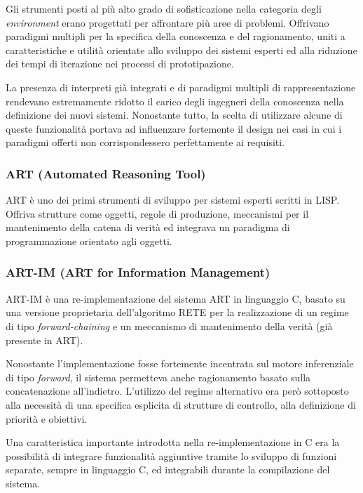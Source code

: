 Gli strumenti posti al più alto grado di sofisticazione nella categoria degli \emph{environment} erano progettati per affrontare più aree di problemi. Offrivano paradigmi multipli per la specifica della conoscenza e del ragionamento, uniti a caratteristiche e utilità orientate allo sviluppo dei sistemi esperti ed alla riduzione dei tempi di iterazione nei processi di prototipazione. 

La presenza di interpreti già integrati e di paradigmi multipli di rappresentazione rendevano estremamente ridotto il carico degli ingegneri della conoscenza nella definizione dei nuovi sistemi. Nonostante tutto, la scelta di utilizzare alcune di queste funzionalità portava ad influenzare fortemente il design nei casi in cui i paradigmi offerti non corrispondessero perfettamente ai requisiti.~\cite{development1993}

\subsubsection[ART]{ART (Automated Reasoning Tool)}
ART è uno dei primi strumenti di sviluppo per sistemi esperti scritti in LISP. Offriva strutture come oggetti, regole di produzione, meccanismi per il mantenimento della catena di verità ed integrava un paradigma di programmazione orientato agli oggetti.~\cite{art1998}

\subsubsection[ART-IM]{ART-IM (ART for Information Management)}
ART-IM è una re-implementazione del sistema ART in linguaggio C, basato su una versione proprietaria dell'algoritmo RETE per la realizzazione di un regime di tipo \emph{forward-chaining} e un meccanismo di mantenimento della verità (già presente in ART).

Nonostante l'implementazione fosse fortemente incentrata sul motore inferenziale di tipo \emph{forward}, il sistema permetteva anche ragionamento basato sulla concatenazione all'indietro. L'utilizzo del regime alternativo era però sottoposto alla necessità di una specifica esplicita di strutture di controllo, alla definizione di priorità e obiettivi.

Una caratteristica importante introdotta nella re-implementazione in C era la possibilità di integrare funzionalità aggiuntive tramite lo sviluppo di funzioni separate, sempre in linguaggio C, ed integrabili durante la compilazione del sistema.

